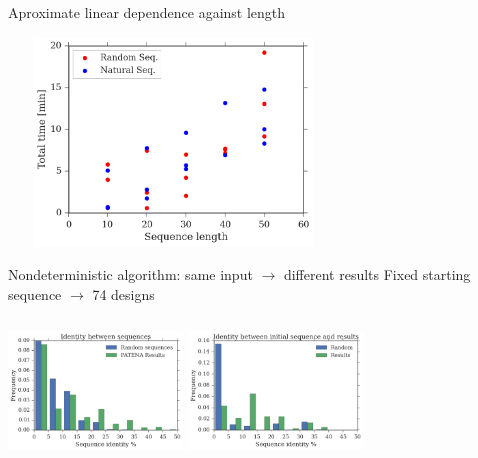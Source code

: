 \documentclass{beamer}
\begin{document}
\begin{frame}[plain]{Aproximate linear dependence against length}
\centering
\begin{adjustwidth}{-1.5em}{-2.5em}
\includegraphics[width=330px,height=210px]{../img/lengthVsTime.png} 
\end{adjustwidth}
\end{frame}





\begin{frame}[plain]{Nondeterministic algorithm: same input $\rightarrow$ different results}
\centering
Fixed starting sequence $\rightarrow$ 74 designs\\
\vspace{15px}
\begin{adjustwidth}{-2.5em}{-2.5em}
\includegraphics[width=175px,height=145px]{../img/againstAll-random.png}
\includegraphics[width=175px,height=145px]{../img/againstInitial-random.png}
\end{adjustwidth}
\end{frame}
\end{document}
